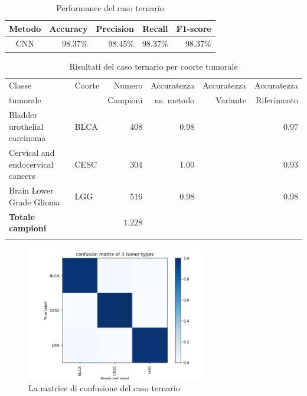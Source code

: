 \begin{table}[h!]
    \centering
    \caption{Performance del caso ternario}
    \begin{tabular}{crrrr}
        \toprule
         Metodo & Accuracy & Precision & Recall & F1-score \\
         \midrule
         CNN    & 98.37\%    & 98.45\%     & 98.37\%  & 98.37\%     \\
         \bottomrule
    \end{tabular}
    \label{tab:ternary_score}
\end{table}
\begin{table}[htbp!]
    \centering 
    \caption{Risultati del caso ternario per coorte tumorale}
    \begin{tabular}{llrrrr}
    \toprule
    Classe   & Coorte & Numero   & Accuratezza & Accuratezza & Accuratezza \\
    tumorale &        & Campioni & ns. metodo  & Variante    & Riferimento \\
    \midrule
    Bladder urothelial carcinoma                    & BLCA & $408$  & 0.98 & & 0.97 \\
    Cervical and endocervical cancers               & CESC & $304$  & 1.00 & & 0.93 \\
    Brain Lower Grade Glioma                        & LGG  & $516$  & 0.98 & & 0.98 \\  
    \midrule
    \textbf{Totale campioni}                        &      & $\mathbf{1.228}$  \\
    \bottomrule
    \label{tab:tern_test_res}
    \end{tabular} 
\end{table}
\begin{figure}
    \centering
    \includegraphics[width=0.7\textwidth]{images/cnfMatrices/cnf_matrix_caso_ternario.png}
    \caption{La matrice di confusione del caso ternario}
    \label{fig:cnf_matrix_ternary}
\end{figure}

